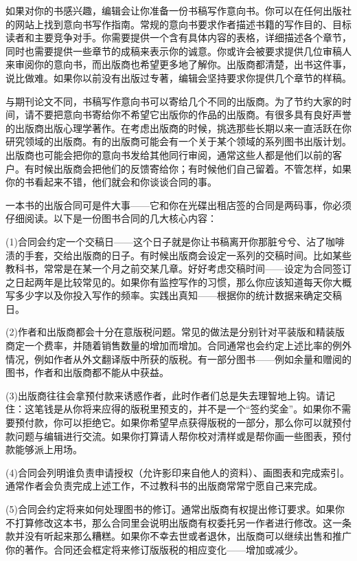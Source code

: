如果对你的书感兴趣，编辑会让你准备一份书稿写作意向书。你可以在任何出版社的网站上找到意向书写作指南。常规的意向书要求作者描述书籍的写作目的、目标读者和主要竞争对手。你需要提供一个含有具体内容的表格，详细描述各个章节，同时也需要提供一些章节的成稿来表示你的诚意。你或许会被要求提供几位审稿人来审阅你的意向书，而出版商也希望更多地了解你。出版商都清楚，出书这件事，说比做难。如果你以前没有出版过专著，编辑会坚持要求你提供几个章节的样稿。

与期刊论文不同，书稿写作意向书可以寄给几个不同的出版商。为了节约大家的时间，请不要把意向书寄给你不希望它出版你的作品的出版商。有很多具有良好声誉的出版商出版心理学著作。在考虑出版商的时候，挑选那些长期以来一直活跃在你研究领域的出版商。有的出版商可能会有一个关于某个领域的系列图书出版计划。出版商也可能会把你的意向书发给其他同行审阅，通常这些人都是他们以前的客户。有时候出版商会把他们的反馈寄给你；有时候他们自己留着。不管怎样，如果你的书看起来不错，他们就会和你谈谈合同的事。

一本书的出版合同可是件大事——它和你在光碟出租店签的合同是两码事，你必须仔细阅读。以下是一份图书合同的几大核心内容：

(1)合同会约定一个交稿日——这个日子就是你让书稿离开你那脏兮兮、沾了咖啡渍的手套，交给出版商的日子。有时候出版商会设定一系列的交稿时间。比如某些教科书，常常是在某一个月之前交某几章。好好考虑交稿时间——设定为合同签订之日起两年是比较常见的。如果你有监控写作的习惯，那么你应该知道每天你大概写多少字以及你投入写作的频率。实践出真知——根据你的统计数据来确定交稿日。

(2)作者和出版商都会十分在意版税问题。常见的做法是分别针对平装版和精装版商定一个费率，并随着销售数量的增加而增加。合同通常也会约定上述比率的例外情况，例如作者从外文翻译版中所获的版税。有一部分图书——例如余量和赠阅的图书，作者和出版商都不能从中获益。

(3)出版商往往会拿预付款来诱惑作者，此时作者们总是失去理智地上钩。请记住：这笔钱是从你将来应得的版税里预支的，并不是一个“签约奖金”。如果你不需要预付款，你可以拒绝它。如果你希望早点获得版税的一部分，那么你可以就预付款问题与编辑进行交流。如果你打算请人帮你校对清样或是帮你画一些图表，预付款能够派上用场。

(4)合同会列明谁负责申请授权（允许影印来自他人的资料）、画图表和完成索引。通常作者会负责完成上述工作，不过教科书的出版商常常宁愿自己来完成。

(5)合同会约定将来如何处理图书的修订。通常出版商有权提出修订要求。如果你不打算修改这本书，那么合同里会说明出版商有权委托另一作者进行修改。这一条款并没有听起来那么糟糕。如果你不幸去世或者退休，出版商可以继续出售和推广你的著作。合同还会框定将来修订版版税的相应变化——增加或减少。

